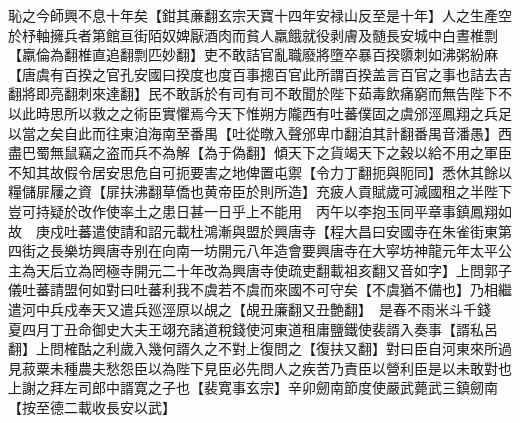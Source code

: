 恥之今師興不息十年矣【鉗其亷翻玄宗天寶十四年安禄山反至是十年】人之生產空於杼軸擁兵者第館亘街陌奴婢厭酒肉而貧人羸餓就役剥膚及髄長安城中白晝椎剽【羸倫為翻椎直追翻剽匹妙翻】吏不敢詰官亂職廢將墮卒暴百揆隳刺如沸粥紛麻【唐虞有百揆之官孔安國曰揆度也度百事摠百官此所謂百揆盖言百官之事也詰去吉翻將即亮翻刺來達翻】民不敢訴於有司有司不敢聞於陛下茹毒飲痛窮而無告陛下不以此時思所以救之之術臣實懼焉今天下惟朔方隴西有吐蕃僕固之虞邠涇鳳翔之兵足以當之矣自此而往東洎海南至番禺【吐從暾入聲邠卑巾翻洎其計翻番禺音潘愚】西盡巴蜀無鼠竊之盗而兵不為解【為于偽翻】傾天下之貨竭天下之穀以給不用之軍臣不知其故假令居安思危自可扼要害之地俾置屯禦【令力丁翻扼與阨同】悉休其餘以糧儲屝屨之資【屝扶沸翻草僑也黄帝臣於則所造】充疲人貢賦歲可減國租之半陛下豈可持疑於改作使率土之患日甚一日乎上不能用　丙午以李抱玉同平章事鎮鳳翔如故　庚戍吐蕃遣使請和詔元載杜鴻漸與盟於興唐寺【程大昌曰安國寺在朱雀街東第四街之長樂坊興唐寺别在向南一坊開元八年造會要興唐寺在大寜坊神龍元年太平公主為天后立為罔極寺開元二十年改為興唐寺使疏吏翻載祖亥翻又音如字】上問郭子儀吐蕃請盟何如對曰吐蕃利我不虞若不虞而來國不可守矣【不虞猶不備也】乃相繼遣河中兵戍奉天又遣兵廵涇原以覘之【覘丑廉翻又丑艶翻】　是春不雨米斗千錢　夏四月丁丑命御史大夫王翊充諸道稅錢使河東道租庸鹽鐵使裴諝入奏事【諝私呂翻】上問榷酤之利歲入幾何諝久之不對上復問之【復扶又翻】對曰臣自河東來所過見菽粟未種農夫愁怨臣以為陛下見臣必先問人之疾苦乃責臣以營利臣是以未敢對也上謝之拜左司郎中諝寛之子也【裴寛事玄宗】辛卯劒南節度使嚴武薨武三鎮劒南【按至德二載收長安以武】

